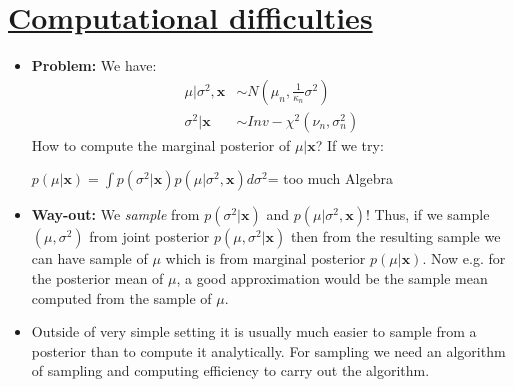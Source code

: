 \documentclass[12pt]{article}
\begin{document}
\section{\underline{Computational difficulties}}
\begin{itemize}
\item \textbf{Problem: }We have:
\begin{align*}
\mu|\sigma^2, \mathbf{x} &\sim N(\mu_n, \frac{1}{\kappa_n}\sigma^2) \\
\sigma^2| \mathbf{x} &\sim Inv-\chi^2(\nu_n, \sigma_n^2) 
\end{align*}
How to compute the marginal posterior of $\mu | \mathbf{x}$? If we try:
\begin{center}
$p(\mu | \mathbf{x}) = \int p(\sigma^2| \mathbf{x}) p(\mu|\sigma^2, \mathbf{x}) d\sigma^2$= too much Algebra
\end{center}
\item \textbf{Way-out:} We \textit{sample} from $p(\sigma^2| \mathbf{x})$ and $p(\mu|\sigma^2, \mathbf{x})$! Thus, if we sample $(\mu, \sigma^2)$ from joint posterior $p(\mu, \sigma^2 | \mathbf{x})$ then from the resulting sample we can have sample of $\mu$ which is from marginal posterior $p(\mu|\mathbf{x})$. Now e.g. for the posterior mean of $\mu$, a good approximation would be the sample mean computed from the sample of $\mu$.
\item Outside of very simple setting it is usually much easier to sample from a posterior than to compute it analytically. For sampling we need an algorithm of sampling and computing efficiency to carry out the algorithm.
\end{itemize}
\end{document}
